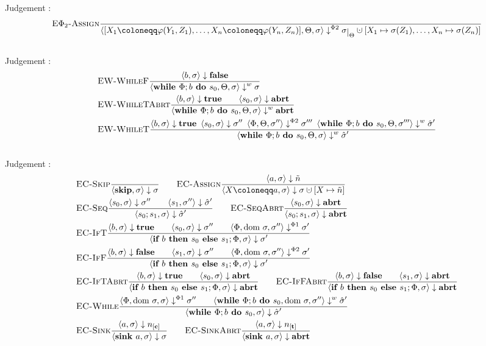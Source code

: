Judgement :
\begin{align*}
    &\bsrule{E$\Phi_2$-Assign}{}
    {\bigsteppr{\defaultphilistn}{\filter}{\store}{\storeassign{\store\restrict{\filter}}{X_1 \mapsto \store(Z_1),\ldots, X_n \mapsto \store(Z_n)}}}\\
\end{align*}
\\
Judgement :
\begin{align*}
    &\textsc{EW-WhileF}\frac{\displaystyle \langle b, \sigma \rangle \downarrow \textbf{false}}{\displaystyle \langle \textbf{while }\Phi;{b} \textbf{ do } {s_0}, \Theta, \sigma \rangle \downarrow^w \sigma}\qquad\\
    &\textsc{EW-WhileTAbrt}\frac{\displaystyle \langle b, \sigma \rangle \downarrow \textbf{true} \qquad 
    \langle s_0, \sigma \rangle \downarrow \textbf{abrt}}{\displaystyle \langle \textbf{while }\Phi;{b} \textbf{ do } {s_0}, \Theta, \sigma \rangle \downarrow^w \textbf{abrt}}\\
    &\textsc{EW-WhileT}\frac{\displaystyle \langle b, \sigma \rangle \downarrow \textbf{true} \enskip
    \langle s_0, \sigma \rangle \downarrow \sigma'' \enskip
    \langle \Phi, \Theta, \sigma'' \rangle \downarrow^{\Phi2} \sigma''' \enskip
    \langle \textbf{while }\Phi;{b} \textbf{ do } {s_0}, \Theta, \sigma''' \rangle \downarrow^w \hat{\sigma}'}{\displaystyle \langle \textbf{while }\Phi;{b} \textbf{ do } {s_0}, \Theta, \sigma \rangle \downarrow^w \hat{\sigma}'}
\end{align*}
\\
Judgement :
\begin{align*}
    &\bsrule{EC-Skip}{}{\bigstep{\skipcmd}{\store}{\store}}\qquad
    \bsrule{EC-Assign}{\bigstep{a}{\store}{\flaggedn{}}}
    {\bigstep{\defaultstore}{\store}{\storeassign{\store}{X \mapsto \flaggedn{}}}} \\
    &\bsrule{EC-Seq}{\bigstep{s_0}{\sigma}{\store''} \qquad \bigstep{s_1}{\store''}{\excstore'}}
    {\bigstep{\defaultssaseq}{\store}{\excstore'}}\qquad
    \bsrule{EC-SeqAbrt}{\bigstep{s_0}{\sigma}{\exception}}
    {\bigstep{\defaultssaseq}{\store}{\exception}} \\
    &\bsrule{EC-IfT}{\bigstep{b}{\store}{\btrue}\qquad \bigstep{s_0}{\store}{\store''}
    \qquad \bigsteppl{\philist}{\dom\store}{\store''}{\store'}}
    {\bigstep{\defaultssaif}{\store}{\store'}}\\
    &\bsrule{EC-IfF}{\bigstep{b}{\store}{\bfalse}\qquad \bigstep{s_1}{\store}{\store''}
    \qquad \bigsteppr{\philist}{\dom\store}{\store''}{\store'}}
    {\bigstep{\defaultssaif}{\store}{\store'}}\\
    &\bsrule{EC-IfTAbrt}{\bigstep{b}{\store}{\btrue}\qquad \bigstep{s_0}{\store}{\exception}}
    {\bigstep{\defaultssaif}{\store}{\exception}} \qquad
    \bsrule{EC-IfFAbrt}{\bigstep{b}{\store}{\bfalse}\qquad \bigstep{s_1}{\store}{\exception}}
    {\bigstep{\defaultssaif}{\store}{\exception}} \\
    &\bsrule{EC-While}{\bigsteppl{\philist}{\dom\store}{\store}{\store''} \qquad
    \bigstepw{\defaultssawhile}{\dom\store}{\store''}{\excstore'}}
    {\bigstep{\defaultssawhile}{\store}{\excstore'}}\\
    &\bsrule{EC-Sink}{\bigstep{a}{\store}{\clean{}}}
    {\bigstep{\defaultsink}{\store}{\store}}\qquad
    \bsrule{EC-SinkAbrt}{\bigstep{a}{\store}{\tracked{}}}
    {\bigstep{\defaultsink}{\store}{\exception}}\\
\end{align*}

